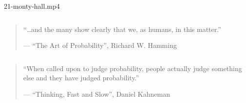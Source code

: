 
\begin{frame}{}
  \begin{center}
    {21-monty-hall.mp4}
  \end{center}
\end{frame}

\begin{frame}{}
  \begin{CJK*}{UTF8}{gbsn}
    \centerline{}
  \end{CJK*}

  \pause
  \begin{columns}
      \pause
  \end{columns}
\end{frame}

\begin{frame}{}
  \begin{quote}
    ``\ldots and the many  show clearly that we, as humans, 
     in this matter.''

    \hfill --- {\small ``The Art of Probability'', Richard W. Hamming}
  \end{quote}

  \begin{columns}
  \end{columns}

  \pause
  \vspace{0.50cm}
  \begin{quote}
    ``When called upon to judge probability, people actually judge something else
    and \textbf{\textit{}} they have judged probability.''

    \hfill --- {\small ``Thinking, Fast and Slow'', Daniel Kahneman}
  \end{quote}
\end{frame}

% 
